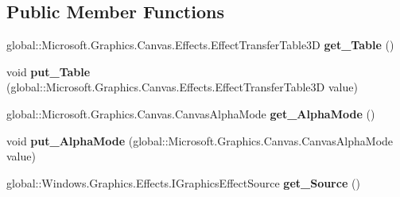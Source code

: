 \subsection*{Public Member Functions}
\begin{DoxyCompactItemize}
\item 
\mbox{\label{interface_microsoft_1_1_graphics_1_1_canvas_1_1_effects_1_1_i_table_transfer3_d_effect_af4748ae4647dd78f75a59a61b482fc70}} 
global\+::\+Microsoft.\+Graphics.\+Canvas.\+Effects.\+Effect\+Transfer\+Table3D {\bfseries get\+\_\+\+Table} ()
\item 
\mbox{\label{interface_microsoft_1_1_graphics_1_1_canvas_1_1_effects_1_1_i_table_transfer3_d_effect_ab603763a514a44367ea6108e1369168a}} 
void {\bfseries put\+\_\+\+Table} (global\+::\+Microsoft.\+Graphics.\+Canvas.\+Effects.\+Effect\+Transfer\+Table3D value)
\item 
\mbox{\label{interface_microsoft_1_1_graphics_1_1_canvas_1_1_effects_1_1_i_table_transfer3_d_effect_a21d268378aa27ae6ca1034dd0f7299ca}} 
global\+::\+Microsoft.\+Graphics.\+Canvas.\+Canvas\+Alpha\+Mode {\bfseries get\+\_\+\+Alpha\+Mode} ()
\item 
\mbox{\label{interface_microsoft_1_1_graphics_1_1_canvas_1_1_effects_1_1_i_table_transfer3_d_effect_a2acd84164258602c46fd7ad7701b2a6b}} 
void {\bfseries put\+\_\+\+Alpha\+Mode} (global\+::\+Microsoft.\+Graphics.\+Canvas.\+Canvas\+Alpha\+Mode value)
\item 
\mbox{\label{interface_microsoft_1_1_graphics_1_1_canvas_1_1_effects_1_1_i_table_transfer3_d_effect_a99a72dee613feb6e1085470ab22cb3a9}} 
global\+::\+Windows.\+Graphics.\+Effects.\+I\+Graphics\+Effect\+Source {\bfseries get\+\_\+\+Source} ()
\item 
\mbox{\label{interface_microsoft_1_1_graphics_1_1_canvas_1_1_effects_1_1_i_table_transfer3_d_effect_a500a3b0cdf37153a399fb4230f6a6a3a}} 

\end{DoxyCompactItemize}
